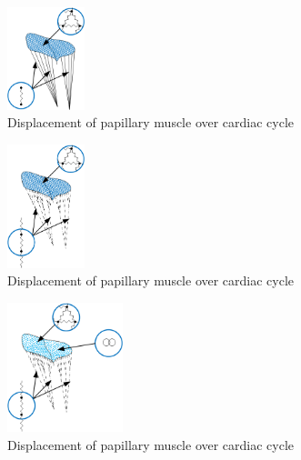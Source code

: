\begin{figure}[H]\label{fig:pc1}
  \centering
  \includegraphics[width=0.2\textwidth]{./fig/pc1.png}
    \caption{Displacement of papillary muscle over cardiac cycle}    
\end{figure}
\begin{figure}[H]\label{fig:pc2}
  \centering
  \includegraphics[width=0.2\textwidth]{./fig/pc2.png}
    \caption{Displacement of papillary muscle over cardiac cycle}    
\end{figure}
\begin{figure}[H]\label{fig:pc3}
  \centering
  \includegraphics[width=0.3\textwidth]{./fig/pc3.png}
    \caption{Displacement of papillary muscle over cardiac cycle}    
\end{figure}
